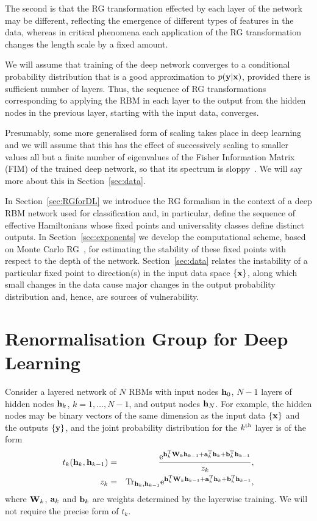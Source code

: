 \documentclass[reprint,amsmath,amssymb,aps]{revtex4-1}
\begin{document}
The second is that the RG transformation effected by each layer of the network may be different, reflecting the emergence of different types of features in the data, whereas in critical phenomena each application of the RG transformation changes the length scale by a fixed amount. 

We will assume that training of the deep network converges to a conditional probability distribution that is a good approximation to $p(\bf y|\bf x)$, provided there is sufficient number of layers. Thus, the sequence of RG transformations corresponding to applying the RBM in each layer to the output from the hidden nodes in the previous layer, starting with the input data, converges. 

Presumably, some more generalised form of scaling takes place in deep learning and we will assume that this has the effect of successively scaling to smaller values all but a finite number of eigenvalues of the Fisher Information Matrix (FIM) of the trained deep network, so that its spectrum is sloppy~\cite{MachtaChachraTranstrumSethna2013}. We will say more about this in Section~\ref{sec:data}.

In Section~\ref{sec:RGforDL} we introduce the RG formalism in the context of a deep RBM network used for classification and, in particular, define the sequence of effective Hamiltonians whose fixed points and universality classes define distinct outputs. In Section~\ref{sec:exponents} we develop the computational scheme, based on Monte Carlo RG~\cite{Ma1976, Swendsen1979}, for estimating the stability of these fixed points with respect to the depth of the network. Section~\ref{sec:data} relates the instability of a particular fixed point to direction(s) in the input data space $\{\bf x\}$, along which small changes in the data cause major changes in the output probability distribution and, hence, are sources of vulnerability.

\section{\label{sec:RGforDL} Renormalisation Group for Deep Learning}

Consider a layered network of $N$ RBMs with input nodes ${\bf h}_0$, $N-1$ layers of hidden nodes ${\bf h}_k$, $k=1,\ldots,N-1$, and output nodes ${\bf h}_N$. For example, the hidden nodes may be binary vectors of the same dimension as the input data $\{\bf x\}$ and the outputs $\{\bf y\}$, and the joint probability distribution for the $k^{\rm th}$ layer is of the form~\cite{Salakhutdinov2015}
\begin{eqnarray}
t_k({\bf h}_k, {\bf h}_{k-1}) &=& \frac{{\rm e}^{{\bf h}_k^{\rm T} {\bf W}_k {\bf h}_{k-1} + {\bf a}_k^{\rm T}{\bf h}_k + {\bf b}_k^{\rm T}{\bf h}_{k-1}}}{z_k},\nonumber\\ 
z_k &=& {\rm Tr}_{{\bf h}_k, {\bf h}_{k-1}}{\rm e}^{{\bf h}_k^{\rm T} {\bf W}_k {\bf h}_{k-1} + {\bf a}_k^{\rm T}{\bf h}_k + {\bf b}_k^{\rm T}{\bf h}_{k-1}},
\label{eq:RBM}
\end{eqnarray}
where ${\bf W}_k$, ${\bf a}_k$ and ${\bf b}_k$ are weights determined by the layerwise training. We will not require the precise form of $t_k$.
\end{document}

